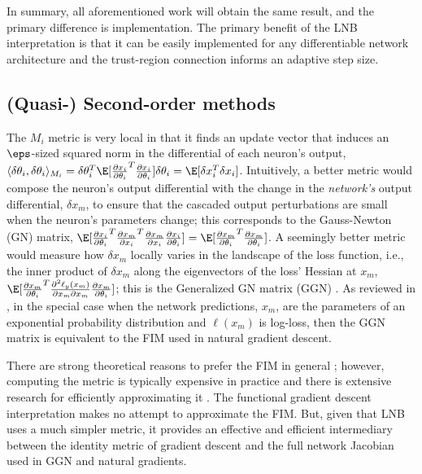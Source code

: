 In summary, all aforementioned work will obtain the same result, and the primary difference
is implementation. The primary benefit of the LNB interpretation is that it can be easily
implemented for any differentiable network architecture and the trust-region connection
informs an adaptive step size.

\subsection{(Quasi-) Second-order methods}
The $M_i$ metric is very local in that it finds
an update vector that induces an $\eps$-sized squared norm in the differential of each neuron's output,
$\langle \delta\theta_i, \delta\theta_i \rangle_{M_i} =
\delta\theta_i^T \E[\frac{\partial x_i}{\partial \theta_i}^T\frac{\partial x_i}{\partial \theta_i}] \delta\theta_i
= \E[\delta x_i^T \delta x_i]$.
Intuitively, a better metric would compose the neuron's output differential with the change in the \emph{network's}
output differential, $\delta x_m$, to ensure that the cascaded output perturbations are small when the neuron's parameters
change; this corresponds to the Gauss-Newton (GN) matrix,
$\E[\frac{\partial x_i}{\partial \theta_i}^T \frac{\partial x_m}{\partial x_i}^T\frac{\partial x_m}{\partial x_i} \frac{\partial x_i}{\partial \theta_i}]
= \E[\frac{\partial x_m}{\partial \theta_i}^T\frac{\partial x_m}{\partial \theta_i}]$.
A seemingly better metric would measure how $\delta x_m$ locally varies in the landscape
of the loss function, i.e., the inner product of $\delta x_m$ along the eigenvectors of the 
loss' Hessian at $x_m$,
$\E[\frac{\partial x_m}{\partial \theta_i}^T \frac{\partial^2 \ell_y(x_m)}{\partial x_m \partial x_m}  \frac{\partial x_m}{\partial \theta_i}]$;
this is the Generalized GN matrix (GGN) \citep{Schraudolph2002}.
As reviewed in \citet{kunster2019},
in the special case when the network predictions, $x_m$, are the parameters of an exponential probability
distribution and $\ell(x_m)$ is log-loss, then the GGN matrix is equivalent to the FIM used in
natural gradient descent.

There are strong theoretical reasons to prefer the FIM in general
\citep{amari1998,martens2020}; however,
computing the metric is typically expensive in practice and there is
extensive research for efficiently approximating it
\citep{martens2015,Ren2021TensorNT}.
The functional gradient descent interpretation makes no attempt to approximate the FIM.
But, given that LNB uses a much simpler metric, it
provides an effective and efficient intermediary between the identity metric of gradient descent
and the full network Jacobian used in GGN and natural gradients.